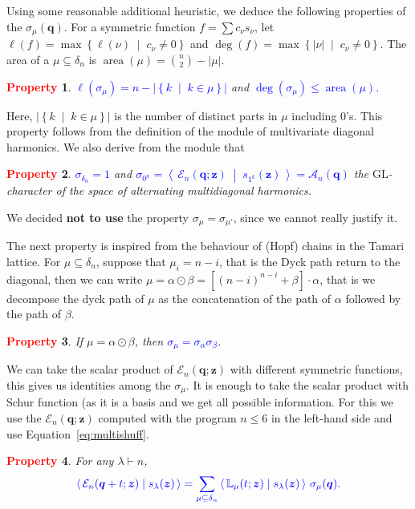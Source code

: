 \documentclass[12pt]{amsart}
\newcommand{\blue}[1]{\textcolor{blue}{#1}}
\newcommand{\red}[1]{\textcolor{red}{#1}}
\theoremstyle{plain}
\newtheorem{property}{\red{Property}}
\theoremstyle{definition}
\theoremstyle{remark}
\newcommand{\Qvar}{{\bm q}}
\newcommand{\Zvar}{{\bm z}}
\newcommand{\GL}{\mathrm{GL}}
\newcommand\area{\mathop{\mathrm{area}}}
\newcommand{\set}[2]{\left\{ #1 \;\middle|\; #2 \right\}} %
\newcommand{\dotprod}[2]{\left\langle \, #1 \; \middle| \; #2 \, \right\rangle} %
\begin{document}
Using some reasonable additional heuristic, we deduce the following properties of the $\sigma_\mu(\Qvar)$.
For a symmetric function $f=\sum c_\nu s_\nu$, let $\ell(f) = \max \set{\ell(\nu)}{c_\nu \ne 0}$ and $\deg(f) = \max\set{|\nu|}{c_\nu \ne 0}$.
The area of a $\mu\subseteq\delta_n$ is $\area(\mu) = {n \choose 2}-|\mu|$.

\begin{property}\label{P:len_deg}
\blue{
$\ell(\sigma_\mu) = n-|\set{k}{k \in \mu}|$} and \blue{$\deg(\sigma_\mu)\le \area(\mu)$.
}
\end{property}

Here, $|\set{k}{k\in\mu}|$ is the number of distinct parts in $\mu$ including $0$'s.
This property follows from the definition of the module of multivariate diagonal harmonics.
We also derive from the module that

\begin{property} \label{P:alt}
\blue{$\sigma_{\delta_n}=1$} and \blue{$\sigma_{0^n} = \dotprod{{\mathcal E}_n(\Qvar;\Zvar)}{s_{1^k} (\Zvar)} = {\mathcal A}_n(\Qvar)$} the $\GL$-character of the space of alternating multidiagonal harmonics.
\end{property}

We decided {\bf not to use} the property $\sigma_\mu = \sigma_{\mu'}$, since we cannot really justify it. 

\medskip
The next property is inspired from the behaviour of (Hopf) chains in the Tamari lattice. For $\mu\subseteq\delta_n$, suppose that $\mu_i=n-i$, that is the Dyck path return to the diagonal, then we can write $\mu=\alpha \odot \beta= [(n-i)^{n-i}+\beta]\cdot\alpha$, that is we decompose the dyck path of $\mu$ as the concatenation of the path of $\alpha$ followed by the path of $\beta$.

\begin{property}\label{P:multi}
If $\mu=\alpha \odot \beta$, then \blue{$\sigma_\mu=\sigma_\alpha\sigma_\beta$}.
\end{property}

We can take the scalar product of ${\mathcal E}_n(\Qvar;\Zvar)$ with different symmetric functions, this gives us identities among the $\sigma_\mu$.
It is enough to take the scalar product with Schur function (as it is a basis and we get all possible information.
For this we use the ${\mathcal E}_n(\Qvar;\Zvar)$ computed with the program $n\le 6$ in the left-hand side and use Equation~\eqref{eq:multishuff}. 

\begin{property}\label{P:coeff}
For any $\lambda \vdash n$,
\[
\blue{
\dotprod{{\mathcal E}_n(\Qvar+t;\Zvar)}{s_\lambda(\Zvar)} = \sum_{\mu\subseteq \delta_n} \dotprod{{\mathbb L}_\mu(t;\Zvar)}{s_\lambda(\Zvar)} \, \sigma_\mu(\Qvar).
}
\]
\end{property}
\end{document}
